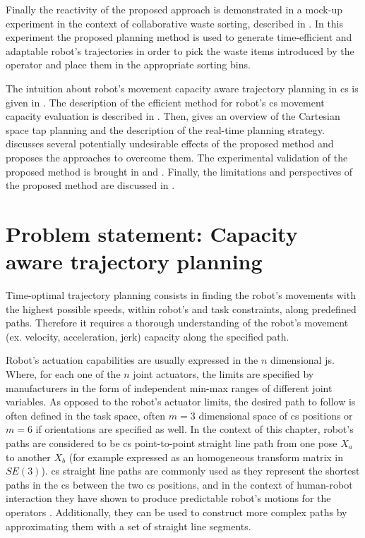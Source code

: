 Finally the reactivity of the proposed approach is demonstrated in a mock-up experiment in the context of collaborative waste sorting, described in . In this experiment the proposed planning method is used to generate time-efficient and adaptable robot's trajectories in order to pick the waste items introduced by the operator and place them in the appropriate sorting bins.

The intuition about robot's movement capacity aware trajectory planning in \gls{cs} is given in . 
The description of the efficient method for robot's \gls{cs} movement capacity evaluation is described in . 
Then,  gives an overview of the Cartesian space \gls{tap} planning and the description of the real-time planning strategy. 
 discusses several potentially undesirable effects of the proposed method and proposes the approaches to overcome them. 
The experimental validation of the proposed method is brought in  and . Finally, the limitations and perspectives of the proposed method are discussed in . 




\section{Problem statement: Capacity aware trajectory planning}\label{ch:problem_statement}

Time-optimal trajectory planning consists in finding the robot's movements with the highest possible speeds, within robot's and task constraints, along predefined paths. 
Therefore it requires a thorough understanding of the robot's movement (ex. velocity, acceleration, jerk) capacity along the specified path. 

Robot's actuation capabilities are usually expressed in the $n$ dimensional \gls{js}. 
Where, for each one of the $n$ joint actuators, the limits are specified by manufacturers in the form of independent min-max ranges of different joint variables. 
As opposed to the robot's actuator limits, the desired path to follow is often defined in the task space, often $m=3$ dimensional space of \gls{cs} positions or $m=6$ if orientations are specified as well. 
In the context of this chapter, robot's paths are considered to be \gls{cs} point-to-point straight line path from one pose $X_a$ to another $X_b$ (for example expressed as an homogeneous transform matrix in $SE(3)$). \gls{cs} straight line paths are commonly used as they represent the shortest paths in the \gls{cs} between the two \gls{cs} positions, and in the context of human-robot interaction they have shown to produce predictable robot's motions for the operators \cite{Dragan2013Legibility}. Additionally, they can be used to construct more complex paths by approximating them with a set of straight line segments.


